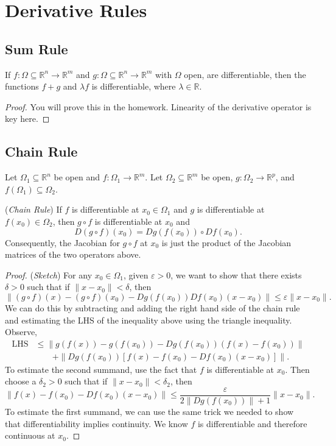 \documentclass[11pt]{article}
\theoremstyle{definition}
\newcommand{\R}{\mathbb{R}}                      %
\begin{document}
\section{Derivative Rules}

\subsection{Sum Rule}

If $f:\Omega\subseteq \R^n\to \R^m$ and $g:\Omega\subseteq \R^n\to \R^m$ with $\Omega$ open, are differentiable, then the functions $f+g$ and $\lambda f$ is differentiable, where $\lambda\in \R$.

\begin{proof}
    You will prove this in the homework. Linearity of the derivative operator is key here.
\end{proof}

\subsection{Chain Rule}
Let $\Omega_1\subseteq\R^n$ be open and $f:\Omega_1\to\R^m$. Let $\Omega_2\subseteq \R^m$ be open, $g:\Omega_2\to \R^p$, and $f(\Omega_1)\subseteq \Omega_2$. 

\prop (\textit{Chain Rule}) If $f$ is differentiable at $x_0\in \Omega_1$ and $g$ is differentiable at $f(x_0)\in\Omega_2$, then $g\circ f$ is differentiable at $x_0$ and 
$$
D(g\circ f)(x_0)=Dg(f(x_0))\circ Df(x_0).
$$
Consequently, the Jacobian for $g\circ f$ at $x_0$ is just the product of the Jacobian matrices of the two operators above.

\begin{proof}(\textit{Sketch})
    For any $x_0\in \Omega_1$, given $\varepsilon>0$, we want to show that there exists $\delta>0$ such that if $\|x-x_0\|<\delta$, then
    $$
    \|(g\circ f)(x)-(g\circ f)(x_0)-Dg(f(x_0))Df(x_0)(x-x_0)\|\leq \varepsilon\|x-x_0\|.
    $$
    We can do this by subtracting and adding the right hand side of the chain rule and estimating the LHS of the inequality above using the triangle inequality. Observe,
    $$
    \begin{aligned}
        \mathrm{LHS}&\leq \|g(f(x))-g(f(x_0))-Dg(f(x_0))(f(x)-f(x_0))\|\\
        &\qquad+\|Dg(f(x_0))[f(x)-f(x_0)-Df(x_0)(x-x_0)]\|.
    \end{aligned}
    $$
    To estimate the second summand, use the fact that $f$ is differentiable at $x_0$. Then choose a $\delta_2>0$ such that if $\|x-x_0\|<\delta_2$, then 
    $$
    \|f(x)-f(x_0)-Df(x_0)(x-x_0)\|\leq \frac{\varepsilon}{2\|Dg(f(x_0))\|+1}\|x-x_0\|.
    $$
    To estimate the first summand, we can use the same trick we needed to show that differentiability implies continuity. We know $f$ is differentiable and therefore continuous at $x_0$.
\end{proof}
\end{document}
